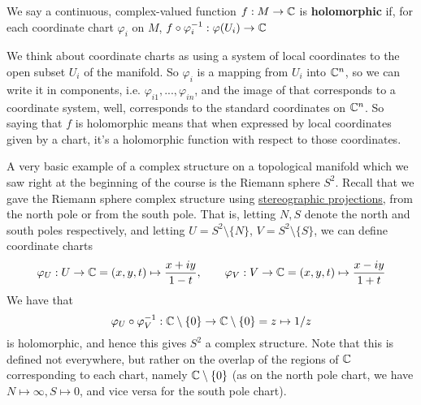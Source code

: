 \documentclass{article}
\begin{document}
\begin{definition}
We say a continuous, complex-valued function \(f: M \to \mathbb{C}\) is \textbf{holomorphic} if, for each coordinate chart \(\varphi_i\) on \(M\), \(f \circ \varphi_i^{-1}: \varphi(U_i) \to \mathbb{C}\)
\end{definition}

We think about coordinate charts as using a system of local coordinates to the open subset \(U_i\) of the manifold. So \(\varphi_i\) is a mapping from \(U_i\) into \(\mathbb{C}^n\), so we can write it in components, i.e. \(\varphi_{i1},...,\varphi_{in}\), and the image of that corresponds to a coordinate system, well, corresponds to the standard coordinates on \(\mathbb{C}^n\). So saying that \(f\) is holomorphic means that when expressed by local coordinates given by a chart, it's a holomorphic function with respect to those coordinates.

\label{example:riemann_complex_structure}
A very basic example of a complex structure on a topological manifold which we saw right at the beginning of the course is the Riemann sphere \(S^2\). Recall that we gave the Riemann sphere complex structure using \hyperref[def:stereographic]{stereographic projections}, from the north pole or from the south pole. That is, letting \(N, S\) denote the north and south poles respectively, and letting \(U = S^2 \setminus \{N\}\), \(V = S^2 \setminus \{S\}\), we can define coordinate charts
\begin{equation}\varphi_U: U \to \mathbb{C} = (x, y, t) \mapsto \frac{x + iy}{1 - t}, \qquad \varphi_V: V \to \mathbb{C} = (x, y, t) \mapsto \frac{x - iy}{1 + t}\end{equation}
We have that
\begin{equation}\varphi_U \circ \varphi_V^{-1}: \mathbb{C} \setminus \{0\} \to \mathbb{C} \setminus \{0\} = z \mapsto 1/z\end{equation}
is holomorphic, and hence this gives \(S^2\) a complex structure. Note that this is defined not everywhere, but rather on the overlap of the regions of \(\mathbb{C}\) corresponding to each chart, namely \(\mathbb{C} \setminus \{0\}\) (as on the north pole chart, we have \(N \mapsto \infty, S \mapsto 0\), and vice versa for the south pole chart).
\end{document}
